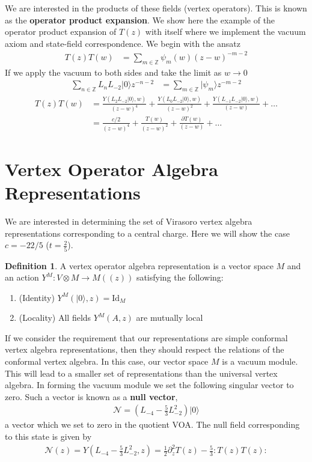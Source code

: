 \documentclass[a4paper,reqno,12pt]{report}
\theoremstyle{definition}
\newtheorem{defn}{Definition}[section]
\newcommand{\Z}{\mathbb{Z}}
\newcommand{\ket}{\rangle}
\numberwithin{equation}{section}
\theoremstyle{plain}
\begin{document}
We are interested in the products of these fields (vertex operators). This is known as the {\bf operator product expansion}. We show here the example of the operator product expansion of $T(z)$ with itself where we implement the vacuum axiom and state-field correspondence. We begin with the ansatz
\begin{align*}
T(z)T(w) &= \sum_{m\in \Z} \psi_m (w)(z-w)^{-m-2}
\end{align*}
If we apply the vacuum to both sides and take the limit as $w\rightarrow 0$
\begin{align*}
\sum_{n\in \Z} L_n L_{-2}|0\ket z^{-n-2}&= \sum_{m\in \Z} |\psi_m\ket z^{-m-2}
\end{align*}
\begin{align*}
T(z)T(w) &= \frac{Y(L_2L_{-2}|0\ket, w)}{(z-w)^4}+ \frac{Y(L_0L_{-2}|0\ket, w)}{(z-w)^2} + \frac{Y(L_{-1}L_{-2}|0\ket, w)}{(z-w)}+ \dots\\
& = \frac{c/2}{(z-w)^4} + \frac{T(w)}{(z-w)^2} + \frac{\partial T(w)}{(z-w)} + \dots
\end{align*}

\section{Vertex Operator Algebra Representations}

We are interested in determining the set of Virasoro vertex algebra representations corresponding to a central charge. Here we will show the case $c=-22/5$ ($t=\frac{2}{5}$).

\begin{defn}
A vertex operator algebra representation is a vector space $M$ and an action $Y^M:V\otimes M\rightarrow M((z))$ satisfying the following:

\begin{enumerate}
\item (Identity) $Y^M(|0\ket,z) = \text{Id}_M$
\item (Locality) All fields $Y^M(A,z)$ are mutually local
\end{enumerate}

\end{defn}

If we consider the requirement that our representations are simple conformal vertex algebra representations, then they should respect the relations of the conformal vertex algebra. In this case, our vector space $M$ is a vacuum module. This will lead to a smaller set of representations than the universal vertex algebra. In forming the vacuum module we set the following singular vector to zero. Such a vector is known as a {\bf null vector},
\begin{align*}
\mathcal{N} = (L_{-4} - \frac{5}{3}L_{-2}^2)|0\ket
\end{align*}
a vector which we set to zero in the quotient VOA. The null field corresponding to this state is given by
\begin{align*}
\mathcal{N}(z) =  Y( L_{-4} - \frac{5}{3}L_{-2}^2, z) = \frac{1}{2}\partial_z^2 T(z) - \frac{5}{3}:T(z)T(z): 
\end{align*}
\end{document}
